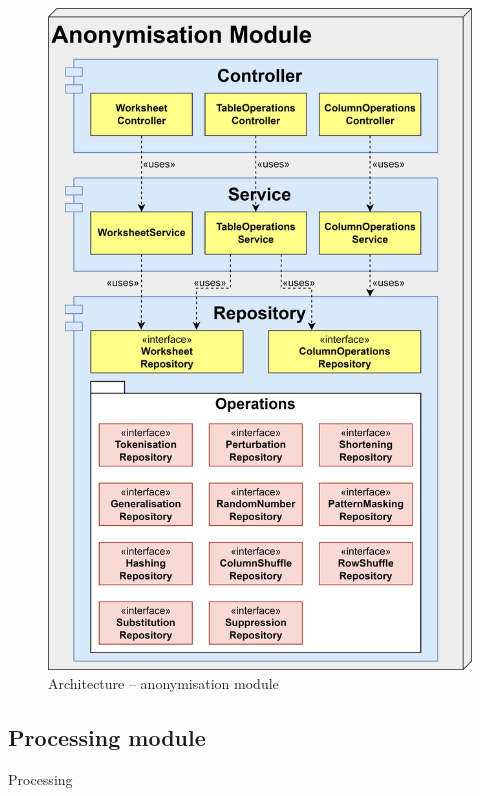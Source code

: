 \documentclass[a4paper,twoside,12pt]{book}
\begin{document}
\begin{itemize}
\begin{figure}
  \centering
  \includegraphics[width=\linewidth]{img/architecture_anonymisation.png}
  \caption{Architecture – anonymisation module}
  \label{fig:architecture_anonymisation}
\end{figure}

\subsection{Processing module}

Processing


\end{itemize}
\end{document}

